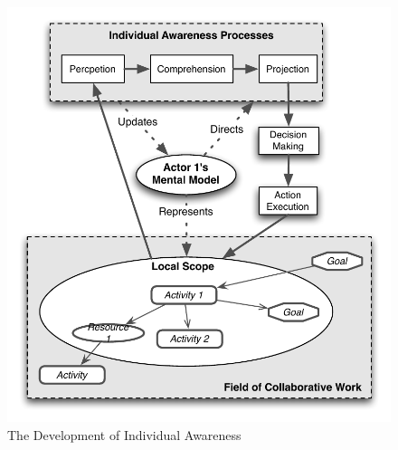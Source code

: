 \begin{figure}[htbp] %
   \centering
   \includegraphics[width=4.5in]{individual_processes.pdf} 
   \caption{The Development of Individual Awareness}
   \label{fig:individual_processes}
\end{figure}


